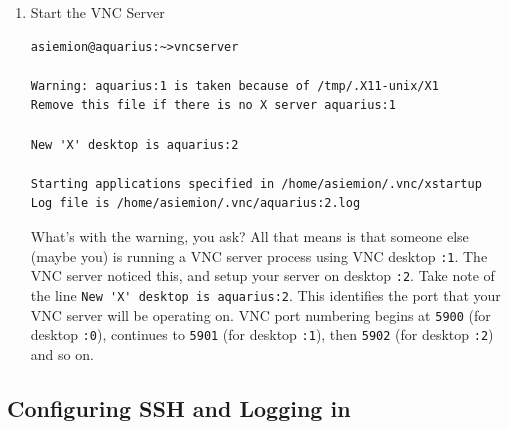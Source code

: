 \documentclass[11pt,preprint]{aastex}
\begin{document}
\begin{enumerate}
\item Start the VNC Server
\begin{verbatim}
asiemion@aquarius:~>vncserver

Warning: aquarius:1 is taken because of /tmp/.X11-unix/X1
Remove this file if there is no X server aquarius:1

New 'X' desktop is aquarius:2

Starting applications specified in /home/asiemion/.vnc/xstartup
Log file is /home/asiemion/.vnc/aquarius:2.log
\end{verbatim}
What's with the warning, you ask?  All that means is that someone else (maybe you) is running a VNC server process using VNC desktop \verb$:1$.  The VNC server noticed this, and setup your 
server on desktop \verb$:2$.  Take note of the line \verb$New 'X' desktop is aquarius:2$.  This identifies the port that your VNC server will be operating on.  VNC port numbering begins at \verb$5900$ 
(for desktop \verb$:0$), continues to \verb$5901$ (for desktop \verb$:1$), then \verb$5902$ (for desktop \verb$:2$) and so on.
\end{enumerate}
\subsection {Configuring SSH and Logging in}
\end{document}
